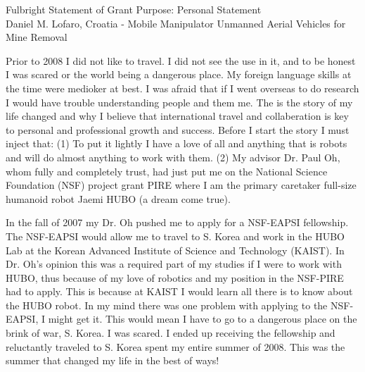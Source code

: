 \documentclass[12pt]{article}
\begin{document}
\begin{center}
Fulbright Statement of Grant Purpose: Personal Statement\\
Daniel M. Lofaro, Croatia - Mobile Manipulator Unmanned Aerial Vehicles for Mine Removal\\

\end{center}

\normalsize
Prior to 2008 I did not like to travel. 
I did not see the use in it, and to be honest I was scared or the world being a dangerous place.  
My foreign language skills at the time were medioker at best.  
I was afraid that if I went overseas to do research I would have trouble understanding people and them me.  
The is the story of my life changed and why I believe that international travel and collaberation is key to personal and professional growth and success.
Before I start the story I must inject that: 
(1) To put it lightly I have a love of all and anything that is robots and will do almost anything to work with them.  
(2) My advisor Dr. Paul Oh, whom fully and completely trust, had just put me on the National Science Foundation (NSF) project grant PIRE where I am the primary caretaker full-size humanoid robot Jaemi HUBO (a dream come true).  

In the fall of 2007 my Dr. Oh pushed me to apply for a NSF-EAPSI fellowship.  
The NSF-EAPSI would allow me to travel to S. Korea and work in the HUBO Lab at the Korean Advanced Institute of Science and Technology (KAIST).  
In Dr. Oh's opinion this was a required part of my studies if I were to work with HUBO, thus because of my love of robotics and my position in the NSF-PIRE had to apply.
This is because at KAIST I would learn all there is to know about the HUBO robot.
In my mind there was one problem with applying to the NSF-EAPSI, I might get it.
This would mean I have to go to a dangerous place on the brink of war, S. Korea.
I was scared.  
I ended up receiving the fellowship and reluctantly traveled to S. Korea spent my entire summer of 2008.  
This was the summer that changed my life in the best of ways!  

\end{document}
